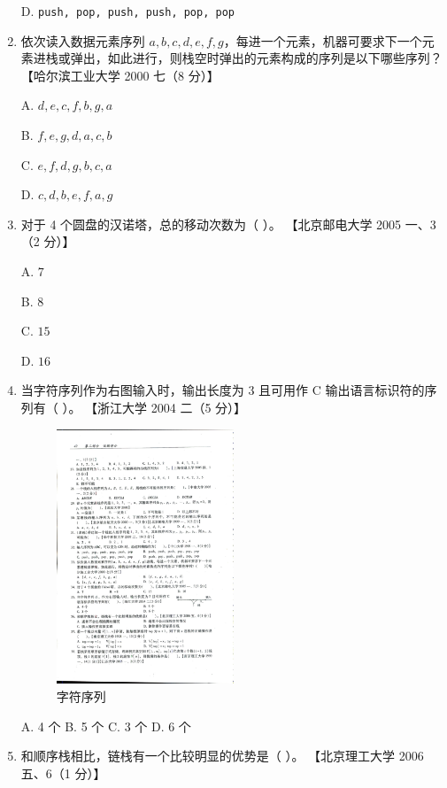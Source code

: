 \documentclass[lang=cn,newtx,10pt,scheme=chinese]{elegantbook}
\begin{document}
\begin{enumerate}
    D. \texttt{push, pop, push, push, pop, pop}  

    \item 依次读入数据元素序列 $a, b, c, d, e,f,g$，每进一个元素，机器可要求下一个元素进栈或弹出，如此进行，则栈空时弹出的元素构成的序列是以下哪些序列？  
    【哈尔滨工业大学 2000 七（8 分）】 

    A. $d,e,c,f,b,g,a$  

    B. $f,e,g,d,a,c,b$  

    C. $e, f,d, g,b, c, a$  

    D. $c, d, b,e,f,a,g$  

    \item 对于 4 个圆盘的汉诺塔，总的移动次数为（ ）。  
    【北京邮电大学 2005 一、3（2 分）】  

    A. $7$  

    B. $8$  

    C. $15$  

    D. $16$  

    \item 当字符序列作为右图输入时，输出长度为 3 且可用作 C 输出语言标识符的序列有（ ）。  
    【浙江大学 2004 二（5 分）】  

    \begin{figure}[h!]
        \centering
        \includegraphics[width=0.5\textwidth]{./figure/exercisePicPDF/chapter3/3-35.pdf}
        \caption{字符序列}
        \label{fig:linear_list_1}
    \end{figure}
    A. 4 个 \quad B. 5 个 \quad C. 3 个 \quad D. 6 个  

    \item 和顺序栈相比，链栈有一个比较明显的优势是（ ）。  
    【北京理工大学 2006 五、6（1 分）】


\end{enumerate}
\end{document}
